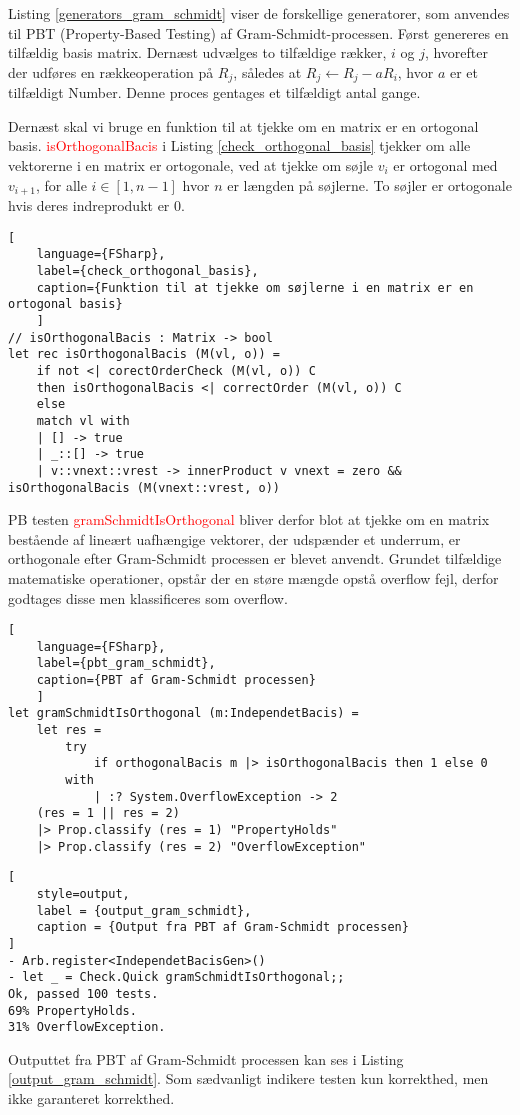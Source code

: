 Listing \ref{generators_gram_schmidt} viser de forskellige generatorer, som anvendes til PBT (Property-Based Testing) af Gram-Schmidt-processen. Først genereres en tilfældig basis matrix. Dernæst udvælges to tilfældige rækker, \(i\) og \(j\), hvorefter der udføres en rækkeoperation på \(R_j\), således at \(R_j \leftarrow R_j - aR_i\), hvor $a$ er et tilfældigt Number. Denne proces gentages et tilfældigt antal gange.

Dernæst skal vi bruge en funktion til at tjekke om en matrix er en ortogonal basis. \textcolor{red}{isOrthogonalBacis} i Listing \ref{check_orthogonal_basis} tjekker om alle vektorerne i en matrix er ortogonale, ved at tjekke om søjle $v_i$ er ortogonal med $v_{i+1}$, for alle $i \in [1, n-1]$ hvor $n$ er længden på søjlerne. To søjler er ortogonale hvis deres indreprodukt er 0.

\begin{lstlisting}[
    language={FSharp}, 
    label={check_orthogonal_basis}, 
    caption={Funktion til at tjekke om søjlerne i en matrix er en ortogonal basis}
    ]
// isOrthogonalBacis : Matrix -> bool
let rec isOrthogonalBacis (M(vl, o)) =
    if not <| corectOrderCheck (M(vl, o)) C 
    then isOrthogonalBacis <| correctOrder (M(vl, o)) C
    else
    match vl with
    | [] -> true
    | _::[] -> true
    | v::vnext::vrest -> innerProduct v vnext = zero && isOrthogonalBacis (M(vnext::vrest, o))
\end{lstlisting}

PB testen \textcolor{red}{gramSchmidtIsOrthogonal} bliver derfor blot at tjekke om en matrix bestående af lineært uafhængige vektorer, der udspænder et underrum, er orthogonale efter Gram-Schmidt processen er blevet anvendt. Grundet tilfældige matematiske operationer, opstår der en støre mængde opstå overflow fejl, derfor godtages disse men klassificeres som overflow.

\begin{lstlisting}[
    language={FSharp}, 
    label={pbt_gram_schmidt}, 
    caption={PBT af Gram-Schmidt processen}
    ]
let gramSchmidtIsOrthogonal (m:IndependetBacis) =
    let res =
        try 
            if orthogonalBacis m |> isOrthogonalBacis then 1 else 0
        with
            | :? System.OverflowException -> 2
    (res = 1 || res = 2)
    |> Prop.classify (res = 1) "PropertyHolds"
    |> Prop.classify (res = 2) "OverflowException"
\end{lstlisting}

\begin{lstlisting}[
    style=output,
    label = {output_gram_schmidt},
    caption = {Output fra PBT af Gram-Schmidt processen}
]
- Arb.register<IndependetBacisGen>()
- let _ = Check.Quick gramSchmidtIsOrthogonal;;
Ok, passed 100 tests.
69% PropertyHolds.
31% OverflowException.
\end{lstlisting}

Outputtet fra PBT af Gram-Schmidt processen kan ses i Listing \ref{output_gram_schmidt}. Som sædvanligt indikere testen kun korrekthed, men ikke garanteret korrekthed.

